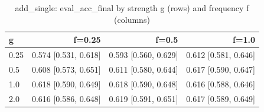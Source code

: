 \begin{table}[t]
\centering
\small
\begin{tabular}{lrrr}
\toprule
g & f=0.25 & f=0.5 & f=1.0 \\
\midrule
0.25 & 0.574 [0.531, 0.618] & 0.593 [0.560, 0.629] & 0.612 [0.581, 0.646] \\
0.5 & 0.608 [0.573, 0.651] & 0.611 [0.580, 0.644] & 0.617 [0.590, 0.647] \\
1.0 & 0.618 [0.590, 0.649] & 0.618 [0.590, 0.648] & 0.616 [0.588, 0.646] \\
2.0 & 0.616 [0.586, 0.648] & 0.619 [0.591, 0.651] & 0.617 [0.589, 0.649] \\
\bottomrule
\end{tabular}
\caption{add\_single: eval\_acc\_final by strength g (rows) and frequency f (columns)}
\label{tab:plasticity_add_single_eval_acc_final}
\end{table}